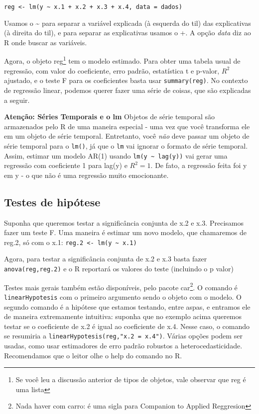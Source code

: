 \documentclass[
]{book}
\begin{document}
\begin{verbatim}
reg <- lm(y ~ x.1 + x.2 + x.3 + x.4, data = dados)
\end{verbatim}

Usamos o \textasciitilde{} para separar a variável explicada (à esquerda do til) das explicativas (à direita do til), e para separar as explicativas usamos o +. A opção \emph{data} diz ao R onde buscar as variáveis.

Agora, o objeto reg\footnote{Se você leu a discussão anterior de tipos de objetos, vale observar que reg é uma lista} tem o modelo estimado. Para obter uma tabela usual de regressão, com valor do coeficiente, erro padrão, estatística t e p-valor, \(R^2\) ajustado, e o teste F para os coeficientes basta usar \texttt{summary(reg)}. No contexto de regressão linear, podemos querer fazer uma série de coisas, que são explicadas a seguir.

\textbf{Atenção: Séries Temporais e o lm}
Objetos de série temporal são armazenados pelo R de uma maneira especial - uma vez que você transforma ele em um objeto de série temporal. Entretanto, você \emph{não} deve passar um objeto de série temporal para o \texttt{lm()}, já que o \texttt{lm} vai ignorar o formato de série temporal. Assim, estimar um modelo AR(1) usando \texttt{lm(y\ \textasciitilde{}\ lag(y))} vai gerar uma regressão com coeficiente 1 para lag(y) e \(R^2 = 1\). De fato, a regressão feita foi y em y - o que não é uma regressão muito emocionante.

\hypertarget{testes-de-hipuxf3tese}{%
\subsection{Testes de hipótese}\label{testes-de-hipuxf3tese}}

Suponha que queremos testar a significância conjunta de x.2 e x.3. Precisamos fazer um teste F. Uma maneira é estimar um novo modelo, que chamaremos de reg.2, só com o x.1: \texttt{reg.2\ \textless{}-\ lm(y\ \textasciitilde{}\ x.1)}

Agora, para testar a significância conjunta de x.2 e x.3 basta fazer \texttt{anova(reg,reg.2)} e o R reportará os valores do teste (incluindo o p valor)

Testes mais gerais também estão disponíveis, pelo pacote car\footnote{Nada haver com carro: é uma sigla para Companion to Applied Reggresion}. O comando é \texttt{linearHypotesis} com o primeiro argumento sendo o objeto com o modelo. O segundo comando é a hipótese que estamos testando, entre aspas, e entramos ele de maneira extremamente intuitiva: suponha que no exemplo acima queremos testar se o coeficiente de x.2 é igual ao coeficiente de x.4. Nesse caso, o comando se resumiria a \texttt{linearHypotesis(reg,"x.2\ =\ x.4")}. Várias opções podem ser usadas, como usar estimadores de erro padrão robustos a heterocedasticidade. Recomendamos que o leitor olhe o help do comando no R.
\end{document}
